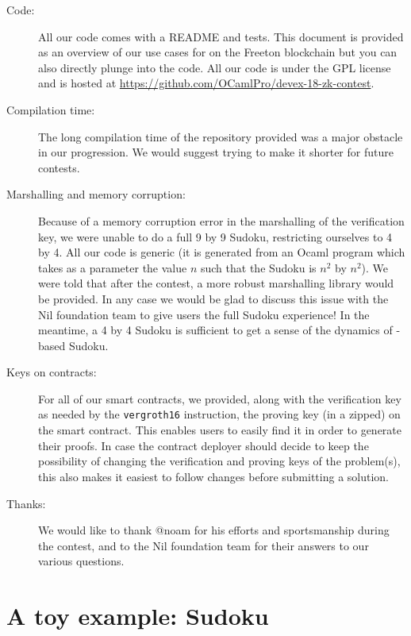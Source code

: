 \documentclass[10pt,a4paper]{article}
\begin{document}
\begin{description}
	\item[Code:] All our code comes with a README and tests. This document is provided as an overview of our use cases for \zksnarks{} on the Freeton blockchain but you can also directly plunge into the code. All our code is under the GPL license and is hosted at \url{https://github.com/OCamlPro/devex-18-zk-contest}.

	\item[Compilation time:] The long compilation time of the repository provided was a major obstacle in our progression. We would suggest trying to make it shorter for future contests.

	\item[Marshalling and memory corruption:] Because of a memory corruption error in the marshalling of the verification key, we were unable to do a full 9 by 9 Sudoku, restricting ourselves to 4 by 4. All our code is generic (it is generated from an Ocaml program which takes as a parameter the value $n$ such that the Sudoku is $n^2$ by $n^2$). We were told that after the contest, a more robust marshalling library would be provided. In any case we would be glad to discuss this issue with the Nil foundation team to give users the full Sudoku experience! In the meantime, a 4 by 4 Sudoku is sufficient to get a sense of the dynamics of \zksnark-based Sudoku.

	\item[Keys on contracts: ] For all of our smart contracts, we provided, along with the verification key as needed by the \verb|vergroth16| instruction, the proving key (in a zipped) on the smart contract. This enables users to easily find it in order to generate their proofs. In case the contract deployer should decide to keep the possibility of changing the verification and proving keys of the problem(s), this also makes it easiest to follow changes before submitting a solution.

	\item[Thanks:] We would like to thank @noam for his efforts and sportsmanship during the contest, and to the Nil foundation team for their answers to our various questions.
\end{description}










\section{A toy example: Sudoku}
\label{section_sudoku}
\end{document}
